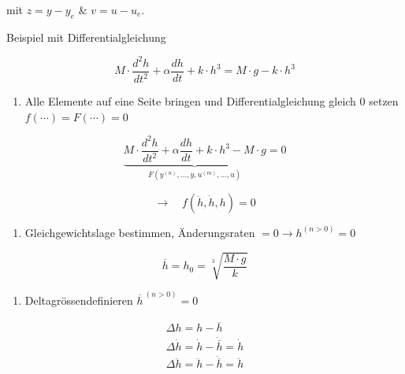 \documentclass[
  10pt,
  a4paper,
  twocolumn]{article}
\providecommand{\tightlist}{%
  \setlength{\itemsep}{0pt}\setlength{\parskip}{0pt}}\usepackage{longtable,booktabs,array}
\numberwithin{equation}{section}
\begin{document}
mit \(z=y-y_e\) \& \(v=u-u_e\).

\begin{tcolorbox}[enhanced jigsaw, bottomtitle=1mm, title=\textcolor{quarto-callout-tip-color}{\faLightbulb}\hspace{0.5em}{Vorgehen}, arc=.35mm, rightrule=.15mm, toprule=.15mm, opacitybacktitle=0.6, coltitle=black, bottomrule=.15mm, toptitle=1mm, colframe=quarto-callout-tip-color-frame, colbacktitle=quarto-callout-tip-color!10!white, breakable, titlerule=0mm, leftrule=.75mm, left=2mm, opacityback=0, colback=white]

Beispiel mit Differentialgleichung

\[
M\cdot \frac{d^2h}{dt^2}+\alpha\frac{dh}{dt}+k\cdot h^3 = M\cdot g-k\cdot h^3
\]

\small

\begin{enumerate}
\def\labelenumi{\arabic{enumi}.}
\tightlist
\item
  Alle Elemente auf eine Seite bringen und Differentialgleichung gleich
  \(0\) setzen \(f(\cdots)=F(\cdots)=0\)
\end{enumerate}

\normalsize

\[
\underbrace{M\cdot \frac{d^2h}{dt^2}+\alpha\frac{dh}{dt}+k\cdot h^3 - M\cdot g}_{F(y^{(n)},\ldots,y,u^{(m)},\ldots,u)}=0
\]

\[
\rightarrow\quad f(\ddot{h}, \dot{h}, h)= 0
\]

\small

\begin{enumerate}
\def\labelenumi{\arabic{enumi}.}
\setcounter{enumi}{1}
\tightlist
\item
  Gleichgewichtslage bestimmen, Änderungsraten
  \(=0\rightarrow h^{(n>0)}=0\)
\end{enumerate}

\normalsize

\[
\overline{h}=h_0=\sqrt[3]{\frac{M\cdot g}{k}}
\]

\small

\begin{enumerate}
\def\labelenumi{\arabic{enumi}.}
\setcounter{enumi}{2}
\tightlist
\item
  Deltagrössendefinieren \(\overline{h}^{\ (n>0)}=0\) \normalsize
\end{enumerate}

\[
\begin{array}{l}
\Delta h = h-\overline{h} \\
\Delta \dot{h} = \dot{h} - \dot{\overline{h}} = \dot{h}\\
\Delta \ddot{h} = \ddot{h} - \ddot{\overline{h}} = \ddot{h} \\
\end{array}
\]


\end{tcolorbox}
\end{document}
